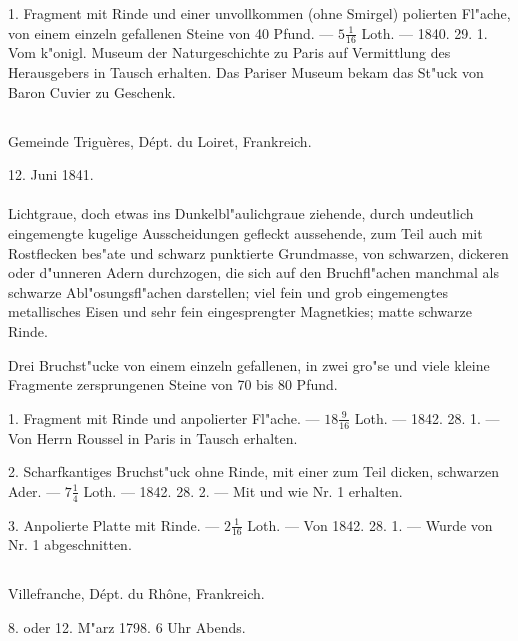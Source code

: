 \documentclass[a4paper, 11pt, oneside, polutonikogreek, german]{article}
\begin{document}
1. Fragment mit Rinde und einer unvollkommen (ohne Smirgel) polierten Fl"ache, von einem einzeln gefallenen Steine von 40 Pfund. --- $\mathfrak{5\frac{1}{16}}$ Loth. --- 1840. 29. 1. Vom k"onigl. Museum der Naturgeschichte zu Paris auf Vermittlung des Herausgebers in Tausch erhalten. Das Pariser Museum bekam das St"uck von Baron Cuvier zu Geschenk.
\subsection{}
\begin{center}

Gemeinde Triguères, Dépt. du Loiret, Frankreich.

12. Juni 1841.
\end{center}
\paragraph{}
Lichtgraue, doch etwas ins Dunkelbl"aulichgraue ziehende, durch undeutlich eingemengte kugelige Ausscheidungen gefleckt aussehende, zum Teil auch mit Rostflecken bes"ate und schwarz punktierte Grundmasse, von schwarzen, dickeren oder d"unneren Adern durchzogen, die sich auf den Bruchfl"achen manchmal als schwarze Abl"osungsfl"achen darstellen; viel fein und grob eingemengtes metallisches Eisen und sehr fein eingesprengter Magnetkies; matte schwarze Rinde.

Drei Bruchst"ucke von einem einzeln gefallenen, in zwei gro"se und viele kleine Fragmente zersprungenen Steine von 70 bis 80 Pfund.

1. Fragment mit Rinde und anpolierter Fl"ache. --- $\mathfrak{18\frac{9}{16}}$ Loth. --- 1842. 28. 1. --- Von Herrn Roussel in Paris in Tausch erhalten.

2. Scharfkantiges Bruchst"uck ohne Rinde, mit einer zum Teil dicken, schwarzen Ader. --- $\mathfrak{7\frac{1}{4}}$ Loth. --- 1842. 28. 2. --- Mit und wie Nr. 1 erhalten.

3. Anpolierte Platte mit Rinde. --- $\mathfrak{2\frac{1}{16}}$ Loth. --- Von 1842. 28. 1. --- Wurde von Nr. 1 abgeschnitten.
\subsection{}
\begin{center}

Villefranche, Dépt. du Rhône, Frankreich.

8. oder 12. M"arz 1798. 6 Uhr Abends.
\end{center}
\end{document}

